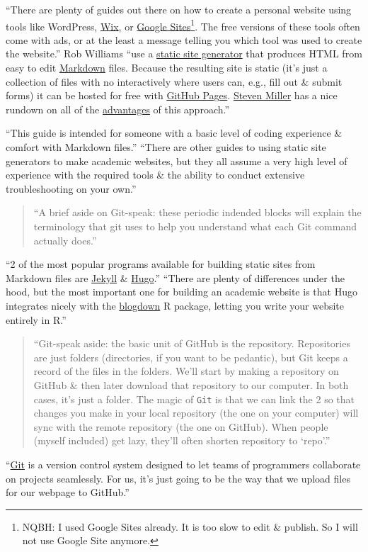 \documentclass{article}
\numberwithin{equation}{section}
\begin{document}
``There are plenty of guides out there on how to create a personal website using tools like WordPress, \href{https://www.wix.com/}{Wix}, or \href{https://www.sites.google.com/}{Google Sites}\footnote{NQBH: I used Google Sites already. It is too slow to edit \& publish. So I will not use Google Site anymore.}. The free versions of these tools often come with ads, or at the least a message telling you which tool was used to create the website.'' Rob Williams ``use a \href{https://www.staticgen.com/about}{static site generator} that produces HTML from easy to edit \href{https://en.wikipedia.org/wiki/Markdown}{Markdown} files. Because the resulting site is static (it's just a collection of files with no interactively where users can, e.g., fill out \& submit forms) it can be hosted for free with \href{https://pages.github.com/}{GitHub Pages}. \href{http://svmiller.com/}{Steven Miller} has a nice rundown on all of the \href{http://svmiller.com/blog/2015/08/create-your-website-in-jekyll/#advantages}{advantages} of this approach.''

``This guide is intended for someone with a basic level of coding experience \& comfort with Markdown files.'' ``There are other guides to using static site generators to make academic websites, but they all assume a very high level of experience with the required tools \& the ability to conduct extensive troubleshooting on your own.''

\begin{quotation}
	``A brief aside on Git-speak: these periodic indended blocks will explain the terminology that git uses to help you understand what each Git command actually does.''
\end{quotation}
``2 of the most popular programs available for building static sites from Markdown files are \href{https://jekyllrb.com/}{Jekyll} \& \href{https://gohugo.io/}{Hugo}.'' ``There are plenty of differences under the hood, but the most important one for building an academic website is that Hugo integrates nicely with the \href{https://bookdown.org/yihui/blogdown/}{blogdown} R package, letting you write your website entirely in R.''

\begin{quotation}
	``Git-speak aside: the basic unit of GitHub is the repository. Repositories are just folders (directories, if you want to be pedantic), but Git keeps a record of the files in the folders. We'll start by making a repository on GitHub \& then later download that repository to our computer. In both cases, it's just a folder. The magic of \texttt{Git} is that we can link the 2 so that changes you make in your local repository (the one on your computer) will sync with the remote repository (the one on GitHub). When people (myself included) get lazy, they'll often shorten repository to `repo'.''
\end{quotation}
``\href{https://git-scm.com/}{Git} is a version control system designed to let teams of programmers collaborate on projects seamlessly. For us, it's just going to be the way that we upload files for our webpage to GitHub.''
\end{document}
